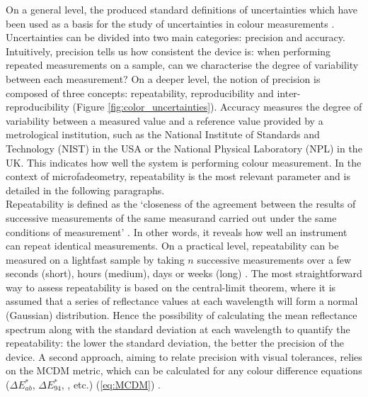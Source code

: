 On a general level, the \citet{joint_committee_for_guides_in_metrology_uncertainty_2008} produced standard definitions of uncertainties which have been used as a basis for the study of uncertainties in colour measurements \citep{early_uncertainty_2004}. Uncertainties can be divided into two main categories: precision and accuracy. Intuitively, precision tells us how consistent the device is: when performing repeated measurements on a sample, can we characterise the degree of variability between each measurement? On a deeper level, the notion of precision is composed of three concepts: repeatability, reproducibility and inter-reproducibility (Figure \ref{fig:color_uncertainties}). Accuracy measures the degree of variability between a measured value and a reference value provided by a metrological institution, such as the National Institute of Standards and Technology (NIST) in the \gls{USA} or the National Physical Laboratory (NPL) in the \gls{UK}. This indicates how well the system is performing colour measurement. In the context of microfadeometry, repeatability is the most relevant parameter and is detailed in the following paragraphs.\\

Repeatability is defined as the ‘closeness of the agreement between the results of successive measurements of the same measurand carried out under the same conditions of measurement’ \citep[35, B2.15]{joint_committee_for_guides_in_metrology_uncertainty_2008}. In other words, it reveals how well an instrument can repeat identical measurements. On a practical level, repeatability can be measured on a lightfast sample by taking $n$ successive measurements over a few seconds (short), hours (medium), days or weeks (long) \citep[125]{berns_billmeyer_2019}. The most straightforward way to assess repeatability is based on the central-limit theorem, where it is assumed that a series of reflectance values at each wavelength will form a normal (Gaussian) distribution. Hence the possibility of calculating the mean reflectance spectrum along with the standard deviation at each wavelength to quantify the repeatability: the lower the standard deviation, the better the precision of the device. A second approach, aiming to relate precision with visual tolerances, relies on the \gls{MCDM} metric, which can be calculated for any colour difference equations ($\Delta E^*_{ab}$, $\Delta E^*_{94}$, \dEOO, etc.) (\ref{eq:MCDM}) \citep{billmeyer_assessment_1981}.

